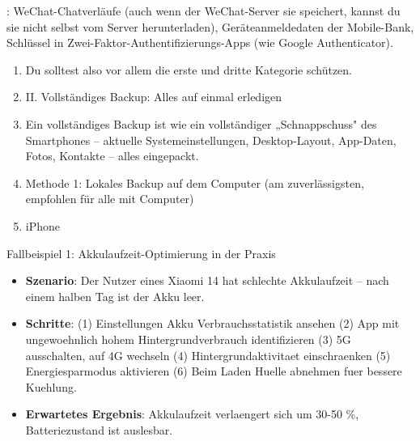 \begin{tcbpractice}{: WeChat-Chatverläufe (auch wenn der WeChat-Server sie speichert, kannst du sie nicht selbst vom Server herunterladen), Geräteanmeldedaten der Mobile-Bank, Schlüssel in Zwei-Faktor-Authentifizierungs-Apps (wie Google Authenticator).}
\begin{enumerate}
  \item Du solltest also vor allem die erste und dritte Kategorie schützen.
  \item II. Vollständiges Backup: Alles auf einmal erledigen
  \item Ein vollständiges Backup ist wie ein vollständiger „Schnappschuss" des Smartphones – aktuelle Systemeinstellungen, Desktop-Layout, App-Daten, Fotos, Kontakte – alles eingepackt.
  \item Methode 1: Lokales Backup auf dem Computer (am zuverlässigsten, empfohlen für alle mit Computer)
  \item iPhone
\end{enumerate}

\end{tcbpractice}

\begin{tcbinfo}{Fallbeispiel 1: Akkulaufzeit-Optimierung in der Praxis}
\begin{itemize}
  \item \textbf{Szenario}: Der Nutzer eines Xiaomi 14 hat schlechte Akkulaufzeit – nach einem halben Tag ist der Akku leer.
  \item \textbf{Schritte}: (1) Einstellungen Akku Verbrauchsstatistik ansehen (2) App mit ungewoehnlich hohem Hintergrundverbrauch identifizieren (3) 5G ausschalten, auf 4G wechseln (4) Hintergrundaktivitaet einschraenken (5) Energiesparmodus aktivieren (6) Beim Laden Huelle abnehmen fuer bessere Kuehlung.
  \item \textbf{Erwartetes Ergebnis}: Akkulaufzeit verlaengert sich um 30-50 \%, Batteriezustand ist auslesbar.
\end{itemize}

\end{tcbinfo}
